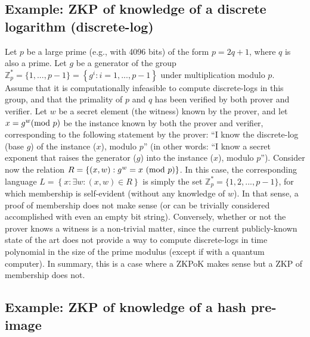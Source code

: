 \subsection{Example: ZKP of knowledge of a discrete logarithm (discrete-log)}
\label{security:zkp-knowledge-vs-membership:ZKPoK-DL}

	Let $p$ be a large prime (e.g., with 4096 bits) of the form $p=2q+1$, where $q$ is also a prime.
	Let $g$ be a generator of the group $\mathbb{Z}^{\ast}_p = \{1,...,p-1\} = \left\{g^i:i=1,...,p-1\right\}$ under multiplication modulo $p$.
	Assume that it is computationally infeasible to compute discrete-logs in this group, and that the primality of $p$ and $q$ has been verified by both prover and verifier.
	Let $w$ be a secret element (the witness) known by the prover, and let $x = g^w (\textmd{mod }p)$ be the instance known by both the prover and verifier, corresponding to the following statement by the prover: ``I know the discrete-log (base $g$) of the instance ($x$), modulo $p$'' (in other words: ``I know a secret exponent that raises the generator ($g$) into the instance ($x$), modulo $p$'').
	Consider now the relation $R = \left\{(x,w): g^w = x~(\textmd{mod }p)\right\}$.
	In this case, the corresponding language $L = \left\{x: \exists w: (x,w) \in R\right\}$ is simply the set  $\mathbb{Z}^{\ast}_p = \{1, 2, ..., p-1\}$, for which membership is self-evident (without any knowledge of $w$).
    In that sense, a proof of membership does not make sense (or can be trivially considered accomplished with even an empty bit string).
	Conversely, whether or not the prover knows a witness is a non-trivial matter, since the current publicly-known state of the art does not provide a way to compute discrete-logs in time polynomial in the size of the prime modulus (except if with a quantum computer).
	In summary, this is a case where a ZKPoK makes sense but a ZKP of membership does not.


\subsection{Example: ZKP of knowledge of a hash pre-image}
\label{security:zkp-knowledge-vs-membership:ZKPoK-hash-pre-image}

